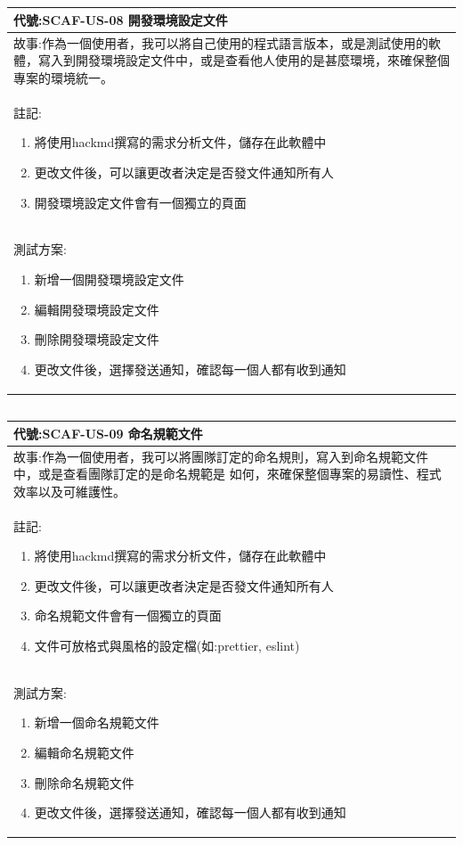 \documentclass{report}
\begin{document}
\subsection*{}
\fontsize{12}{20}\selectfont
\begin{tabularx}{\textwidth}{|X|}
  \hline
  代號:SCAF-US-08 開發環境設定文件 \\
  \hline
  故事:作為一個使用者，我可以將自己使用的程式語言版本，或是測試使用的軟體，寫入到開發環境設定文件中，或是查看他人使用的是甚麼環境，來確保整個專案的環境統一。 \\
  \hline
  註記:
  \begin{enumerate}
    \item 將使用hackmd撰寫的需求分析文件，儲存在此軟體中
    \item 更改文件後，可以讓更改者決定是否發文件通知所有人
    \item 開發環境設定文件會有一個獨立的頁面
  \end{enumerate} \\
  \hline
  測試方案:
  \begin{enumerate}
    \item 新增一個開發環境設定文件
    \item 編輯開發環境設定文件
    \item 刪除開發環境設定文件
    \item 更改文件後，選擇發送通知，確認每一個人都有收到通知
  \end{enumerate} \\
  \hline
\end{tabularx}

\subsection*{}
\fontsize{12}{20}\selectfont
\begin{tabularx}{\textwidth}{|X|}
  \hline
  代號:SCAF-US-09 命名規範文件 \\
  \hline
  故事:作為一個使用者，我可以將團隊訂定的命名規則，寫入到命名規範文件中，或是查看團隊訂定的是命名規範是
  如何，來確保整個專案的易讀性、程式效率以及可維護性。 \\
  \hline
  註記:
  \begin{enumerate}
    \item 將使用hackmd撰寫的需求分析文件，儲存在此軟體中
    \item 更改文件後，可以讓更改者決定是否發文件通知所有人
    \item 命名規範文件會有一個獨立的頁面
    \item 文件可放格式與風格的設定檔(如:prettier, eslint)
  \end{enumerate} \\
  \hline
  測試方案:
  \begin{enumerate}
    \item 新增一個命名規範文件
    \item 編輯命名規範文件
    \item 刪除命名規範文件
    \item 更改文件後，選擇發送通知，確認每一個人都有收到通知
  \end{enumerate} \\
  \hline
\end{tabularx}
\end{document}

